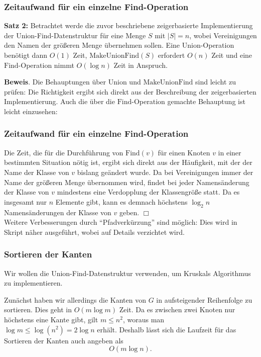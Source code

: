 \documentclass[smaller,xcolor=dvipsnames]{beamer}
\newcommand{\opfind}{\text{Find}}
\newcommand{\opunion}{\text{Union}}
\newcommand{\opmakeunionfind}{\text{MakeUnionFind}}
\begin{document}
\begin{frame}
\frametitle{Zeitaufwand für ein einzelne Find-Operation}
\textbf{Satz 2:}
Betrachtet werde die zuvor beschriebene \alert{zeigerbasierte Implementierung der Union-Find-Datenstruktur} für eine Menge $S$ mit $|S|=n$, wobei Vereinigungen den Namen der größeren Menge übernehmen sollen. Eine $\opunion$-Operation benötigt dann $O(1)$ Zeit, $\opmakeunionfind{(S)}$ erfordert $O(n)$ Zeit und eine $\opfind$-Operation nimmt $O(\log{n})$ Zeit in Anspruch. \\ \medskip

\textbf{Beweis}. Die Behauptungen über $\opunion$ und $\opmakeunionfind$ sind leicht zu prüfen: Die Richtigkeit ergibt sich direkt aus der Beschreibung der zeigerbasierten Implementierung. Auch die über die $\opfind$-Operation gemachte Behauptung ist leicht einzusehen: 
\end{frame}

\begin{frame}
\frametitle{Zeitaufwand für ein einzelne Find-Operation}
Die Zeit, die für die Durchführung von $\opfind{(v)}$ für einen Knoten $v$ in einer bestimmten Situation nötig ist, ergibt sich direkt aus der Häufigkeit, mit der der Name der Klasse von $v$ bislang geändert wurde. Da bei Vereinigungen immer der Name der größeren Menge übernommen wird, findet bei jeder Namensänderung der Klasse von $v$ mindestens eine Verdopplung der Klassengröße statt. Da es insgesamt nur $n$ Elemente gibt, kann es demnach höchstens $\log_2{n}$ Namensänderungen der Klasse von $v$ geben. \qquad $\Box$ \\ \medskip
Weitere Verbesserungen durch \enquote{Pfadverkürzung} sind möglich: Dies wird in Skript näher ausgeführt, wobei auf Details verzichtet wird.
\end{frame}

\begin{frame}
\frametitle{Sortieren der Kanten}
Wir wollen die Union-Find-Datenstruktur verwenden, um Kruskals Algorithmus zu implementieren. \\ \medskip

Zunächst haben wir allerdings die Kanten von $G$ in aufsteigender Reihenfolge zu sortieren. Dies geht in $O(m \log m)$ Zeit. Da es zwischen zwei Knoten nur höchstens eine Kante gibt, gilt $m \leq n^2$, woraus man $\log m \leq \log{(n^2)} = 2 \log n$ erhält. Deshalb lässt sich die \alert{Laufzeit für das Sortieren der Kanten} auch angeben als
\[
O(m \log n).
\]
\end{frame}
\end{document}
